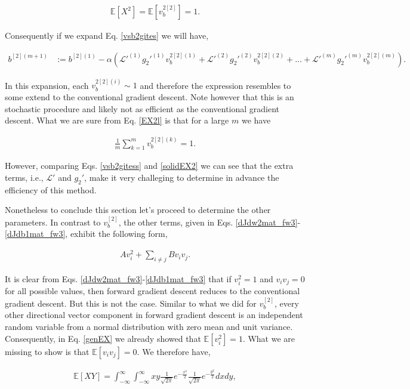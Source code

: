 \documentclass{article}
\begin{document}
\begin{align}
\mathbb{E}[X^2] = \mathbb{E}[v_b^{2[2]}] = 1.
\label{EX2l}
\end{align}

Consequently if we expand Eq. \eqref{vsb2gites} we will have,

\begin{align}
b^{[2](m+1)} &:= b^{[2](1)} - \alpha \left( \mathcal{L}'^{(1)}
g_2'^{(1)} v_b^{2[2](1)}+\mathcal{L}'^{(2)}
g_2'^{(2)} v_b^{2[2](2)}+...+\mathcal{L}'^{(m)}
g_2'^{(m)} v_b^{2[2](m)}\right).
\label{vsb2gitess}
\end{align}

In this expansion, each $v_b^{2[2](i)}\sim 1$ and therefore the expression resembles to some extend to the conventional gradient descent. Note however that this is an stochastic procedure and likely not as efficient as the conventional gradient descent. What we are sure from Eq. \eqref{EX2l} is that for a large $m$ we have

\begin{align}
\frac{1}{m}\sum_{k=1}^m v_b^{2[2](k)}  = 1.
\label{solidEX2}
\end{align}

However, comparing Eqs. \eqref{vsb2gitess} and \eqref{solidEX2} we can see that the extra terms, i.e., $\mathcal{L}'$ and $g_2'$, make it very challeging to determine in advance the efficiency of this method.

Nonetheless to conclude this section let's proceed to determine the other parameters. In contrast to $v_b^{[2]}$, the other terms, given in Eqs. \eqref{dJdw2mat_fw3}-\eqref{dJdb1mat_fw3}, exhibit the following form,

\begin{align}
A v_i^2 + \sum_{i\neq j}B v_i v_j.
\label{genEX}
\end{align}

It is clear from Eqs. \eqref{dJdw2mat_fw3}-\eqref{dJdb1mat_fw3} that if $v_i^2=1$ and $v_i v_j=0 $ for all possible values, then forward gradient descent reduces to the conventional gradient descent. But this is not the case. Similar to what we did for  $v_b^{[2]}$, every other directional vector component in forward gradient descent is an independent random variable from a normal distribution with zero mean and unit variance. Consequently, in Eq. \eqref{genEX} we already showed that $\mathbb{E}[v_i^2]=1$. What we are missing to show is that $\mathbb{E}[v_iv_j]=0$. We therefore have,
 
\begin{align}
\label{EXY}
\mathbb{E}[XY] = \int_{-\infty}^{\infty}\int_{-\infty}^{\infty}xy \frac{1}{\sqrt{2\pi}}e^{-\frac{x^2}{2}}\frac{1}{\sqrt{2\pi}}e^{-\frac{y^2}{2}}dxdy,
\end{align}
\end{document}
